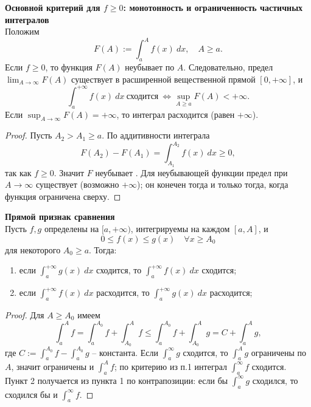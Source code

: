 \documentclass[14pt]{extreport}
\begin{document}
    \begin{theorem}
        \textbf{Основной критерий для $f \geq 0$: монотонность и ограниченность частичных интегралов}\\
        Положим
        \[
        F(A) := \int_a^A f(x)\ dx, \quad A \geq a.
        \]
        Если $f \geq 0$, то функция $F(A)$ неубывает по $A$. Следовательно, предел $\lim_{A \rightarrow \infty} F(A)$ существует в расширенной вещественной прямой $[0,+\infty]$, и
        \[
        \int_a^{+\infty} f(x)\ dx\ \text{сходится}\ \Leftrightarrow \sup_{A \geq a} F(A) < +\infty.
        \]
        Если $\sup_{A \rightarrow \infty} F(A) = +\infty$, то интеграл расходится (равен $+\infty$).
    \end{theorem}
    \begin{proof}
        Пусть $A_2 > A_1 \geq a$. По аддитивности интеграла
        \[
        F(A_2) - F(A_1) = \int_{A_1}^{A_2} f(x)\ dx \geq 0,
        \]
        так как $f \geq 0$. Значит $F$ неубывает . Для неубывающей функции предел при $A \rightarrow \infty$ существует (возможно $+\infty$); он конечен тогда и только тогда, когда функция ограничена сверху.
    \end{proof}

    \begin{theorem}
        \textbf{Прямой признак сравнения}\\
        Пусть $f,g$ определены на $[a,+\infty)$, интегрируемы на каждом $[a,A]$, и
        \[
        0 \leq f(x) \leq g(x) \quad \forall x \geq A_0
        \]
        для некоторого $A_0 \geq a$. Тогда:
        \begin{enumerate}
            \item если $\int_a^{+\infty} g(x)\ dx$ сходится, то $\int_a^{+\infty} f(x)\ dx$ сходится;
            \item если $\int_a^{+\infty} f(x)\ dx$ расходится, то $\int_a^{+\infty} g(x)\ dx$ расходится;
        \end{enumerate}
    \end{theorem}
    \begin{proof}
        Для $A \geq A_0$ имеем
        \[
        \int_a^A f = \int_a^{A_0} f + \int_{A_0}^A f \leq \int_a^{A_0} f + \int_{A_0}^A g = C + \int_a^A g,
        \]
        где $C := \int_a^{A_0} f - \int_a^{A_0} g$ – константа. Если $\int_a^\infty g$ сходится, то $\int_a^A g$ ограничены по $A$, значит ограничены и $\int_a^A f$; по критерию из п.1 интеграл $\int_a^\infty f$ сходится.\\
        Пункт 2 получается из пункта 1 по контрапозиции: если бы $\int_a^\infty g$ сходился, то сходился бы и $\int_a^\infty f$.
    \end{proof}
\end{document}
